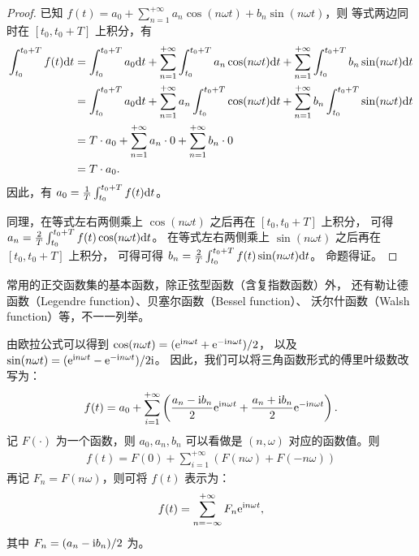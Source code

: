 \begin{proof}
    已知 $f(t) = a_0 + \sum_{n = 1}^{+\infty}a_n\cos(n\omega t) + b_n\sin(n\omega t)$，则
    等式两边同时在 $[t_0, t_0 + T]$ 上积分，有
    \begin{align*}
        \int_{t_0}^{t_0 + T}f(t)\mathrm{d}t & = \int_{t_0}^{t_0 + T}a_0\mathrm{d}t + \sum_{n = 1}^{+\infty}\int_{t_0}^{t_0 + T}a_n\cos(n\omega t)\mathrm{d}t + \sum_{n = 1}^{+\infty}\int_{t_0}^{t_0 + T}b_n\sin(n\omega t)\mathrm{d}t \\
        & = \int_{t_0}^{t_0 + T}a_0\mathrm{d}t + \sum_{n = 1}^{+\infty}a_n\int_{t_0}^{t_0 + T}\cos(n\omega t)\mathrm{d}t + \sum_{n = 1}^{+\infty}b_n\int_{t_0}^{t_0 + T}\sin(n\omega t)\mathrm{d}t \\
        & = T \cdot a_0 + \sum_{n = 1}^{+\infty}a_n\cdot 0 + \sum_{n = 1}^{+\infty}b_n\cdot 0 \\
        & = T \cdot a_0.
    \end{align*}
    因此，有 $a_0 = \frac{1}{T}\int_{t_0}^{t_0 + T}f(t)\mathrm{d}t$。

    同理，在等式左右两侧乘上 $\cos(n \omega t)$ 之后再在 $[t_0, t_0 + T]$ 上积分，
    可得 $a_n = \frac{2}{T}\int_{t_0}^{t_0 + T}f(t)\cos(n\omega t)\mathrm{d}t$。
    在等式左右两侧乘上 $\sin(n \omega t)$ 之后再在 $[t_0, t_0 + T]$ 上积分，
    可得可得 $b_n = \frac{2}{T}\int_{t_0}^{t_0 + T}f(t)\sin(n\omega t)\mathrm{d}t$。
    命题得证。
\end{proof}

\begin{remark}
    常用的正交函数集的基本函数，除正弦型函数（含复指数函数）外，
    还有勒让德函数（Legendre function）、贝塞尔函数（Bessel function）、
    沃尔什函数（Walsh function）等，不一一列举。
\end{remark}

\begin{definition}[复指数形式傅里叶级数]
    由欧拉公式可以得到 $\cos(n\omega t) = (\mathrm{e}^{\mathrm{i} n\omega t} + \mathrm{e}^{-\mathrm{i} n\omega t}) / 2$，
    以及 $\sin(n\omega t) = (\mathrm{e}^{\mathrm{i} n\omega t} - \mathrm{e}^{-\mathrm{i} n\omega t}) / 2\mathrm{i}$。
    因此，我们可以将三角函数形式的傅里叶级数改写为：
    \begin{align*}
        f(t) = a_0 + \sum_{i = 1}^{+\infty}\left(\frac{a_n - \mathrm{i} b_n}{2}\mathrm{e}^{\mathrm{i} n\omega t} + \frac{a_n + \mathrm{i} b_n}{2}\mathrm{e}^{-\mathrm{i} n\omega t}\right).
    \end{align*}
    记 $F(\cdot)$ 为一个函数，则 $a_0, a_n, b_n$ 可以看做是 $(n, \omega)$ 对应的函数值。则
    \begin{align*}
        f(t) = F(0) + \sum_{i = 1}^{+\infty}\left(F(n\omega)+ F(-n\omega)\right)
    \end{align*}
    再记 $F_n = F(n\omega)$，则可将 $f(t)$ 表示为：
    \begin{align*}
        f(t) = \sum_{n = -\infty}^{+\infty}F_n\mathrm{e}^{\mathrm{i} n\omega t},
    \end{align*}
    其中 $F_n = (a_n - \mathrm{i} b_n) / 2$ 为。
\end{definition}

